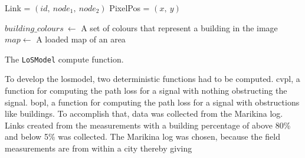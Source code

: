 \begin{algorithm}[H]
    \DontPrintSemicolon

    Link = $(\mathit{id},\ \mathit{node_1},\ \mathit{node_2})$\;
    PixelPos = $(\mathit{x},\ \mathit{y})$\;\;
    
    $\mathit{building\_colours}\ \leftarrow$ A set of colours that represent a building in the image\;
    $\mathit{map} \leftarrow$ A loaded map of an area\;

    \caption{The \texttt{LoSModel} compute function.}
    \label{algo:}
\end{algorithm}




To develop the \gls{losmodel}, two deterministic functions had to be computed. \gls{cvpl}, a function for computing the path loss for a signal with nothing obstructing the signal. \gls{bopl}, a function for computing the path loss for a signal with obstructions like buildings. To accomplish that, data was collected from the Marikina log. Links created from the measurements with a building percentage of above 80\% and below 5\% was collected.
The Marikina log was chosen, because the field measurements are from within a city thereby giving

